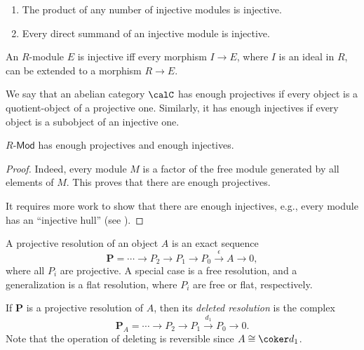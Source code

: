 \begin{prop}
    \begin{enumerate}
        \item The product of any number of injective modules is injective.
        \item Every direct summand of an injective module is injective.
    \end{enumerate}
\end{prop}

\begin{thm}
    An $R$-module $E$ is injective iff every morphism $I\to E$, where $I$ is an ideal in $R$, can be extended to a morphism $R\to E$.
\end{thm}


\begin{defn}
    We say that an abelian category $\calC$ has enough projectives if every object is a quotient-object of a projective one. Similarly, it has enough injectives if every object is a subobject of an injective one.
\end{defn}

\begin{prop}
    $R\text{-}\mathsf{Mod}$ has enough projectives and enough injectives. 
\end{prop}
\begin{proof}
     Indeed, every module $M$ is a factor of the free module generated by all elements of $M$. This proves that there are enough projectives. 
     
     It requires more work to show that there are enough injectives, e.g., every module has an ``injective hull'' (see \cite[Thm. 3.38]{Rotman}).
\end{proof}

\begin{defn}
    A projective resolution of an object $A$ is an exact sequence
    \[\bm{P}=\cdots \to P_2\to P_1\to P_0\overset\epsilon\to A\to 0,\]
    where all $P_i$ are projective. A special case is a free resolution, and a generalization is a flat resolution, where $P_i$ are free or flat, respectively.
    
    If $\bm{P}$ is a projective resolution of $A$, then its \emph{deleted resolution} is the complex
    \[\bm{P}_A=\cdots\to P_2\to P_1\overset{d_1}\to P_0\to 0.\]
    Note that the operation of deleting is reversible since $A\cong \coker d_1$.
\end{defn}


